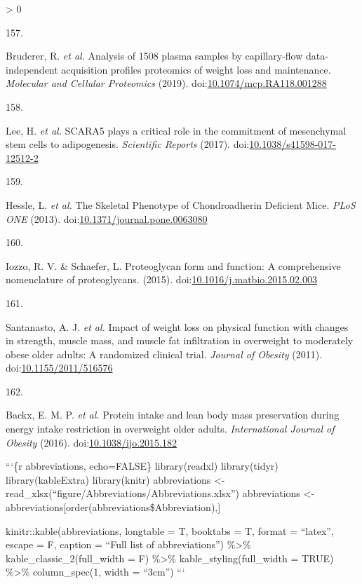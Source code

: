 \documentclass[11pt,twoside]{bristolthesis}
\newlength{\cslhangindent}
\newlength{\csllabelwidth}
\newenvironment{CSLReferences}[2] %
 {%
  \setlength{\parindent}{0pt}
  \ifodd #1 \everypar{\setlength{\hangindent}{\cslhangindent}}\ignorespaces\fi
  \ifnum #2 > 0
  \setlength{\parskip}{#2\baselineskip}
  \fi
 }%
 {}
\newcommand{\CSLLeftMargin}[1]{\parbox[t]{\csllabelwidth}{#1}}
\newcommand{\CSLRightInline}[1]{\parbox[t]{\linewidth - \csllabelwidth}{#1}\break}
\begin{document}
\begin{CSLReferences}{0}{0}
\leavevmode\hypertarget{ref-Bruderer2019}{}%
\CSLLeftMargin{157. }
\CSLRightInline{Bruderer, R. \emph{et al.} {Analysis of 1508 plasma samples by capillary-flow data-independent acquisition profiles proteomics of weight loss and maintenance}. \emph{Molecular and Cellular Proteomics} (2019). doi:\href{https://doi.org/10.1074/mcp.RA118.001288}{10.1074/mcp.RA118.001288}}

\leavevmode\hypertarget{ref-Lee2017a}{}%
\CSLLeftMargin{158. }
\CSLRightInline{Lee, H. \emph{et al.} {SCARA5 plays a critical role in the commitment of mesenchymal stem cells to adipogenesis}. \emph{Scientific Reports} (2017). doi:\href{https://doi.org/10.1038/s41598-017-12512-2}{10.1038/s41598-017-12512-2}}

\leavevmode\hypertarget{ref-Hessle2013}{}%
\CSLLeftMargin{159. }
\CSLRightInline{Hessle, L. \emph{et al.} {The Skeletal Phenotype of Chondroadherin Deficient Mice}. \emph{PLoS ONE} (2013). doi:\href{https://doi.org/10.1371/journal.pone.0063080}{10.1371/journal.pone.0063080}}

\leavevmode\hypertarget{ref-Iozzo2015}{}%
\CSLLeftMargin{160. }
\CSLRightInline{Iozzo, R. V. \& Schaefer, L. {Proteoglycan form and function: A comprehensive nomenclature of proteoglycans}. (2015). doi:\href{https://doi.org/10.1016/j.matbio.2015.02.003}{10.1016/j.matbio.2015.02.003}}

\leavevmode\hypertarget{ref-Santanasto2011}{}%
\CSLLeftMargin{161. }
\CSLRightInline{Santanasto, A. J. \emph{et al.} {Impact of weight loss on physical function with changes in strength, muscle mass, and muscle fat infiltration in overweight to moderately obese older adults: A randomized clinical trial}. \emph{Journal of Obesity} (2011). doi:\href{https://doi.org/10.1155/2011/516576}{10.1155/2011/516576}}

\leavevmode\hypertarget{ref-Backx2016}{}%
\CSLLeftMargin{162. }
\CSLRightInline{Backx, E. M. P. \emph{et al.} {Protein intake and lean body mass preservation during energy intake restriction in overweight older adults}. \emph{International Journal of Obesity} (2016). doi:\href{https://doi.org/10.1038/ijo.2015.182}{10.1038/ijo.2015.182}}

\end{CSLReferences}
  \begin{abbreviations}
    ```\{r abbreviations, echo=FALSE\}
    library(readxl)
    library(tidyr)
    library(kableExtra)
    library(knitr)
    abbreviations \textless- read\_xlsx(``figure/Abbreviations/Abbreviations.xlsx'')
    abbreviations \textless- abbreviations{[}order(abbreviations\$Abbreviation),{]}

    kinitr::kable(abbreviations, longtable = T, booktabs = T, format = ``latex'', escape = F,
    caption = ``Full list of abbreviations'') \%\textgreater\%
    kable\_classic\_2(full\_width = F) \%\textgreater\%
    kable\_styling(full\_width = TRUE) \%\textgreater\%
    column\_spec(1, width = ``3cm'')
    ```
  \end{abbreviations}
\end{document}
